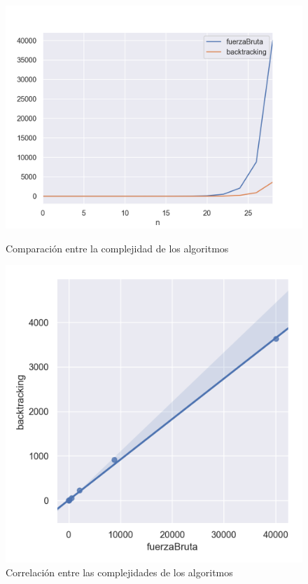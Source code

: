 \begin{figure}[H]
   \begin{minipage}{0.5\textwidth}
     \centering
     \includegraphics[width=1\linewidth]{img/fb_vs_bt_1}
     \caption{Comparación entre la complejidad de los algoritmos}
   \end{minipage}\hfill
   \begin{minipage}{0.5\textwidth}
     \centering
     \includegraphics[width=1\linewidth]{img/fb_vs_bt_2}
     \caption{Correlación entre las complejidades de los algoritmos}
   \end{minipage}
\end{figure}

